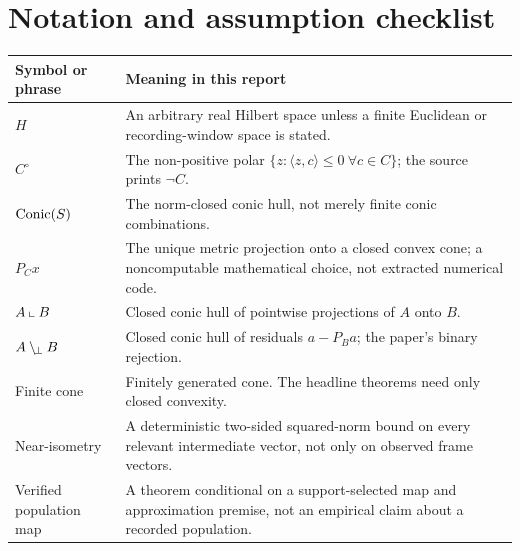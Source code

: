 \documentclass[11pt,a4paper]{article}
\begin{document}
\section{Notation and assumption checklist}
\label{app:notation}

\begin{tabularx}{\linewidth}{@{}L{35mm}Y@{}}
\toprule
\textbf{Symbol or phrase} & \textbf{Meaning in this report} \\
\midrule
\(H\) &
An arbitrary real Hilbert space unless a finite Euclidean or recording-window
space is stated. \\
\(C^\circ\) &
The non-positive polar \(\{z:\langle z,c\rangle\leq0\ \forall c\in C\}\);
the source prints \(\neg C\). \\
\(\operatorname{Conic}(S)\) &
The norm-closed conic hull, not merely finite conic combinations. \\
\(P_Cx\) &
The unique metric projection onto a closed convex cone; a noncomputable
mathematical choice, not extracted numerical code. \\
\(A\mathbin{\llcorner} B\) &
Closed conic hull of pointwise projections of \(A\) onto \(B\). \\
\(A\mathbin{\backslash_{\!\perp}} B\) &
Closed conic hull of residuals \(a-P_Ba\); the paper's binary rejection. \\
Finite cone &
Finitely generated cone. The headline theorems need only closed convexity. \\
Near-isometry &
A deterministic two-sided squared-norm bound on every relevant intermediate
vector, not only on observed frame vectors. \\
Verified population map &
A theorem conditional on a support-selected map and approximation premise,
not an empirical claim about a recorded population. \\
\bottomrule
\end{tabularx}
\end{document}
